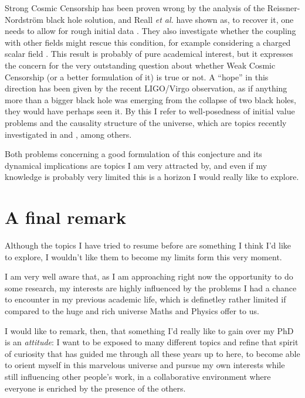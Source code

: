 \documentclass[12pt, a4paper]{article}
\begin{document}
Strong Cosmic Censorship has been proven wrong by the analysis of the Reissner-Nordstr\"om black hole solution, and Reall \emph{et al.} have shown as, to recover it, one needs to allow for rough initial data \cite{dias2018strong}. They also investigate whether the coupling with other fields might rescue this condition, for example considering a charged scalar field \cite{Dias:2018ufh}.
This result is probably of pure academical interest, but it expresses the concern for the very outstanding question about whether Weak Cosmic Censorship (or a better formulation of it) is true or not. 
A ``hope'' in this direction has been given by the recent LIGO/Virgo observation, as if anything more than a bigger black hole was emerging from the collapse of two black holes, they would have perhaps seen it. By this I refer to well-posedness of initial value problems and the causality structure of the universe, which are topics recently investigated in \cite{Kovacs:2020pns} and \cite{Reall:2021voz}, among others.

Both problems concerning a good formulation of this conjecture and its dynamical implications are topics I am very attracted by, and even if my knowledge is probably very limited this is a horizon I would really like to explore.

	\section{A final remark}
Although the topics I have tried to resume before are something I think I'd like to explore, I wouldn't like them to become my limits form this very moment. 

I am very well aware that, as I am approaching right now the opportunity to do some research, my interests are highly influenced by the problems I had a chance to encounter in my previous academic life, which is definetley rather limited if compared to the huge and rich universe Maths and Physics offer to us.

I would like to remark, then, that %
something I'd really like to gain over my PhD is an \emph{attitude}: I want to be exposed to many different topics and refine that spirit of curiosity that has guided me through all these years up to here, to become able to orient myself in this marvelous universe and pursue my own interests while still influencing other people's work, in a collaborative environment where everyone is enriched by the presence of the others.
\end{document}
